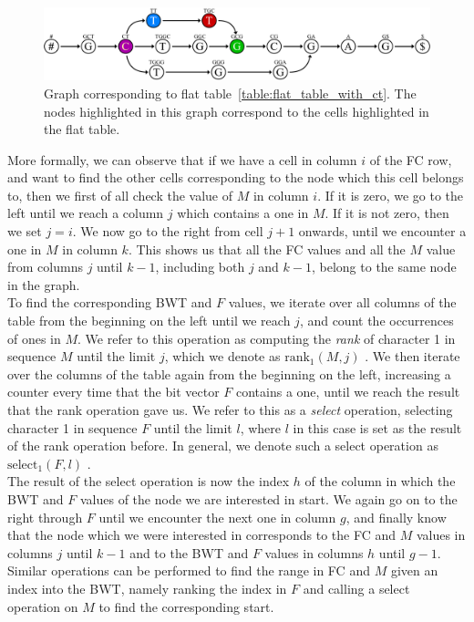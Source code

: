 \documentclass[a4paper,12pt,twoside,BCOR=10mm]{scrbook}
\begin{document}
\begin{figure}[!htb]
\centering
\includegraphics[width=\textwidth]{evo_fig_flat_table_with_ct.pdf}
\caption[Graph corresponding to a flat table]{Graph corresponding to flat table~\ref{table:flat_table_with_ct}. The nodes highlighted in this graph correspond to the cells highlighted in the flat table.} \label{fig:evo_fig_flat_table_with_ct}
\end{figure}
More formally, we can observe that 
if we have a cell in column $ i $ of the FC row, and want to find the other cells corresponding to 
the node which this cell belongs to, then we first of all check the value of $ M $ in column $ i $. 
If it is zero, we go to the left until we reach a column $ j $ which contains a one in $ M $. 
If it is not zero, then we set $ j = i $. 
We now go to the right from cell $ j + 1 $ onwards, until we encounter a one in $ M $ in column $ k $. 
This shows us that all the FC values and all the $ M $ value 
from columns $ j $ until $ k - 1 $, including both $ j $ and $ k - 1 $, 
belong to the same node in the graph. \\
To find the corresponding BWT and $ F $ values, we iterate over all columns of the table from the beginning on 
the left until we reach $ j $, and count the occurrences of ones in $ M $. 
We refer to this operation as computing the \textit{rank} of character 1 in sequence $ M $ until the limit $ j $, 
which we denote as $ \textrm{rank}_1 ( M, j ) $ \citep{Siren2009}.\label{def:rank} 
We then iterate over the columns of the table again from the beginning on the left, 
increasing a counter every time that the bit vector $ F $ contains a one, until we reach 
the result that the rank operation gave us. 
We refer to this as a \textit{select} operation, selecting character 1 in sequence $ F $ until the limit $ l $, 
where $ l $ in this case is set as the result of the rank operation before. In general, 
we denote such a select operation as $ \textrm{select}_1 ( F, l ) $ \citep{Siren2009}.\label{def:select} \\
The result of the select operation is now the index $ h $ of the column in which the BWT and $ F $ values 
of the node we are interested in start. 
We again go on to the right through $ F $ until we encounter the next one in column $ g $, 
and finally know that the node which we were interested in corresponds to the 
FC and $ M $ values in columns $ j $ until $ k - 1 $ and to the BWT and $ F $ values in columns $ h $ until $ g - 1 $. \\
Similar operations can be performed to find the range in FC and $ M $ given an index into the BWT, 
namely ranking the index in $ F $ and calling a select operation on $ M $ to find the corresponding start.
\end{document}
